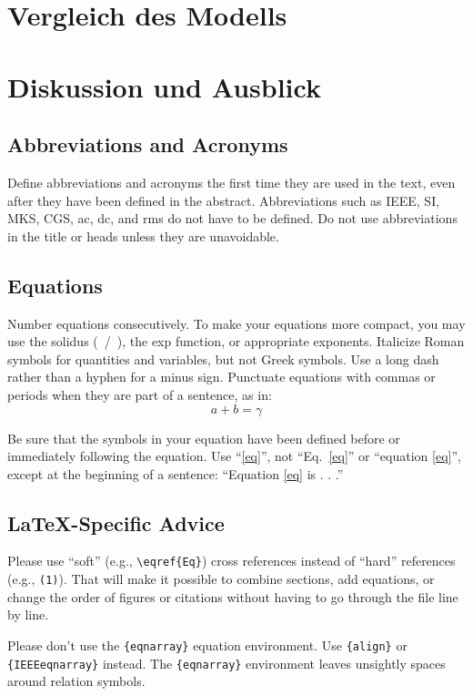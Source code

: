\documentclass[conference]{IEEEtran}
\begin{document}
\section{Vergleich des Modells}

\section{Diskussion und Ausblick}


\subsection{Abbreviations and Acronyms}\label{AA}
Define abbreviations and acronyms the first time they are used in the text, 
even after they have been defined in the abstract. Abbreviations such as 
IEEE, SI, MKS, CGS, ac, dc, and rms do not have to be defined. Do not use 
abbreviations in the title or heads unless they are unavoidable.


\subsection{Equations}
Number equations consecutively. To make your 
equations more compact, you may use the solidus (~/~), the exp function, or 
appropriate exponents. Italicize Roman symbols for quantities and variables, 
but not Greek symbols. Use a long dash rather than a hyphen for a minus 
sign. Punctuate equations with commas or periods when they are part of a 
sentence, as in:
\begin{equation}
a+b=\gamma\label{eq}
\end{equation}

Be sure that the 
symbols in your equation have been defined before or immediately following 
the equation. Use ``\eqref{eq}'', not ``Eq.~\eqref{eq}'' or ``equation \eqref{eq}'', except at 
the beginning of a sentence: ``Equation \eqref{eq} is . . .''

\subsection{\LaTeX-Specific Advice}

Please use ``soft'' (e.g., \verb|\eqref{Eq}|) cross references instead
of ``hard'' references (e.g., \verb|(1)|). That will make it possible
to combine sections, add equations, or change the order of figures or
citations without having to go through the file line by line.

Please don't use the \verb|{eqnarray}| equation environment. Use
\verb|{align}| or \verb|{IEEEeqnarray}| instead. The \verb|{eqnarray}|
environment leaves unsightly spaces around relation symbols.
\end{document}
